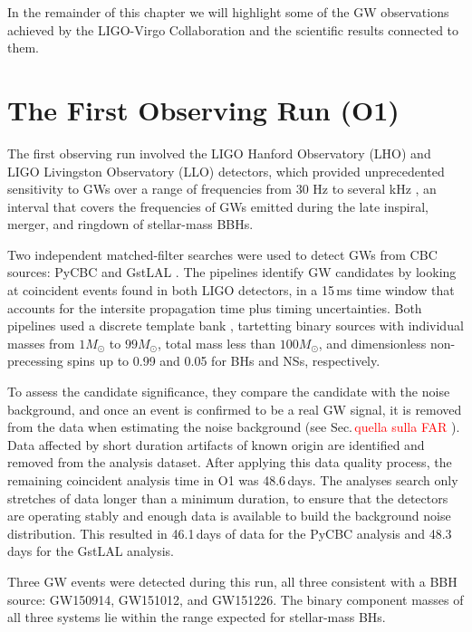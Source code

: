 \documentclass[binding=0.6cm, LaM]{sapthesis}
\newcommand{\fpg}[1]{\textcolor{red}{#1} }
\begin{document}
        In the remainder of this chapter we will highlight some of the GW observations achieved by the LIGO-Virgo Collaboration and the scientific results connected to them.

\section{The First Observing Run (O1)}

	The first observing run involved the LIGO Hanford Observatory (LHO) and LIGO Livingston Observatory (LLO) detectors, which provided unprecedented sensitivity to GWs
	over a range of frequencies from 30 Hz to several kHz \cite{14}, an interval that  
	covers the frequencies of GWs emitted during 
	the late inspiral, merger, and ringdown of stellar-mass BBHs.

	Two independent matched-filter searches were used to detect GWs from CBC sources: PyCBC \cite{109-112} and GstLAL \cite{112-114}.
	The pipelines identify GW candidates by looking at coincident events 
	found in both LIGO detectors, in a 15\,ms time window 
	that accounts for the intersite propagation time plus timing uncertainties. 
	Both pipelines used a discrete template bank \cite{42, 114, 115, 117-120}, tartetting binary sources with individual masses from $1{M_\odot}$ to $99{M_\odot}$,
	total mass less than $100{M_\odot}$, and dimensionless non-precessing spins up to 0.99 and 0.05 for BHs and NSs, respectively.

	To assess the candidate significance, they compare the candidate with the noise background, 
	and once an event is confirmed to be a real GW signal, it is removed from the data when estimating the noise background (see Sec.\,\fpg{quella sulla FAR}).
	Data affected by short duration artifacts of known origin are identified and removed from the analysis dataset.
	After applying this data quality process, the remaining coincident analysis time in O1 was 48.6\,days. 
	The analyses search only stretches of data longer than a minimum duration, 
	to ensure that the detectors are operating stably and enough data is available to build the background noise distribution.  This 
	resulted in 46.1\,days of data for the PyCBC analysis and 48.3\,days for the GstLAL analysis.

	Three GW events were detected during this run, all three consistent with a BBH source: GW150914, GW151012, and GW151226.
	The binary component masses of all three systems lie 
	within the range expected for stellar-mass BHs. 
\end{document}
